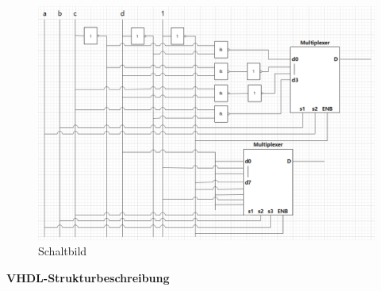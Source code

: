 \documentclass[fleqn]{article}
\begin{document}
\begin{figure}[htbp]
\centering\includegraphics[width=6in]{bild1.png}
\caption{Schaltbild}
\end{figure}

\textbf{VHDL-Strukturbeschreibung}
 
\end{document}
